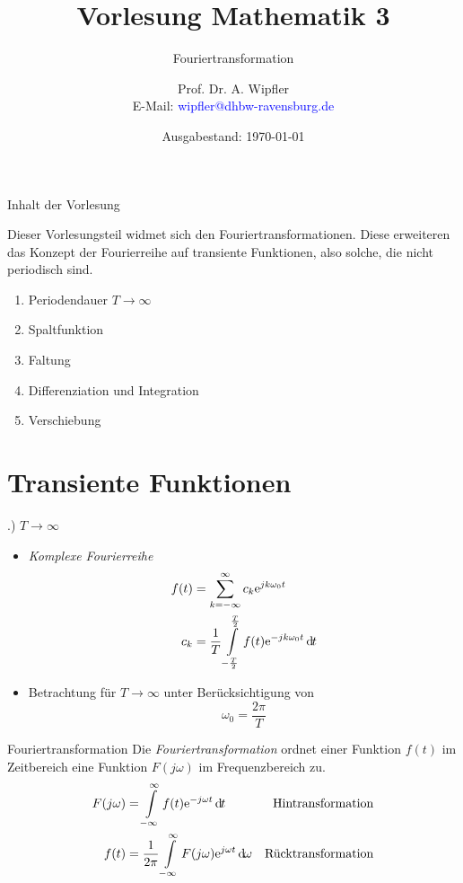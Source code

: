 \documentclass[t,14pt]{beamer}
\title[]{Vorlesung Mathematik 3}
\subtitle{Fouriertransformation}
\author[]{Prof. Dr. A. Wipfler\\ E-Mail: \textcolor{blue}{wipfler@dhbw-ravensburg.de}}
\institute[]{{\footnotesize Duale Hochschule Baden-W\"urttemberg, Ravensburg/Friedrichshafen}}
\date[]{Ausgabestand: \today}
\newcommand*\diff{\mathop{}\!\mathrm{d\hspace{-1pt}}}	%
\newcommand*\euler{\mathrm{e}} %
\begin{document}
\begin{frame}
\titlepage
\end{frame}





\begin{frame}{Inhalt der Vorlesung}


Dieser Vorlesungsteil widmet sich den Fouriertransformationen. Diese erweiteren das Konzept der Fourierreihe
auf transiente Funktionen, also solche, die nicht periodisch sind.
\begin{enumerate}
\item Periodendauer $T\to\infty$
\item Spaltfunktion
\item Faltung
\item Differenziation und Integration
\item Verschiebung
\end{enumerate}

\end{frame}

\section{Transiente Funktionen}
\begin{frame}{\thesection .) $T\to\infty$}
\begin{itemize}
    \item \emph{Komplexe Fourierreihe}
    \begin{align*}
        f(t)    &= \suml_{k=-\infty}^{\infty}c_k\euler^{jk\omega_0t}\\
        c_k     &= \frac{1}{T}\intl_{-\frac{T}{2}}^{\frac{T}{2}}f(t)\euler^{-jk\omega_0t}\diff t
    \end{align*} 
    \item Betrachtung für $T\to\infty$ unter Berücksichtigung von 
    \[
    \omega_0 = \frac{2\pi}{T}
    \]
    \begin{center}
    \end{center}
\end{itemize}
\begin{alertblock}{Fouriertransformation}
    Die \emph{Fouriertransformation} ordnet einer Funktion $f(t)$ im Zeitbereich eine Funktion $F(j\omega)$ im 
    Frequenzbereich zu.
    \begin{align*}
        F(j\omega)  &= \intl_{-\infty}^{\infty} f(t)\euler^{-j\omega t}\diff t                          &\text{Hintransformation}\\
        f(t)        &= \frac{1}{2\pi}\intl_{-\infty}^{\infty}F(j\omega)\euler^{j\omega t}\diff\omega    &\text{Rücktransformation}
    \end{align*}
\end{alertblock}
\end{frame}
\end{document}
